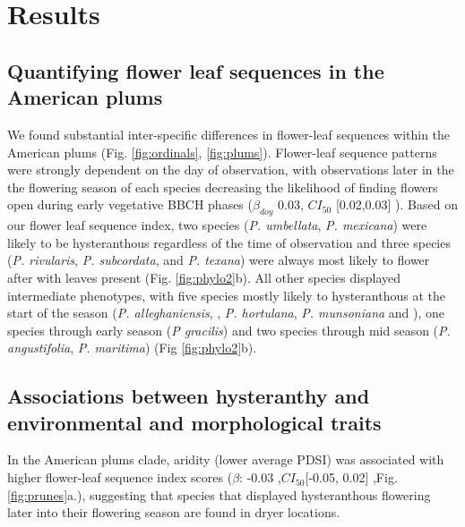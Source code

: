 \documentclass{article}[11pt]
\begin{document}
{%


\section*{Results}
\subsection*{Quantifying flower leaf sequences in the American plums}
We found substantial inter-specific differences in flower-leaf sequences within the American plums (Fig. \ref{fig:ordinals}, \ref{fig:plums}). %
Flower-leaf sequence patterns were strongly dependent on the day of observation, with observations later in the the flowering season of each species decreasing the likelihood of finding flowers open during early vegetative BBCH phases ($\beta_{doy}$ 0.03, $CI_{50}$ [0.02,0.03] ). Based on our flower leaf sequence index, two species (\textit{P. umbellata}, \textit{P. mexicana}) were likely to be hysteranthous regardless of the time of observation and three species (\textit{P. rivularis}, \textit{P. subcordata}, and \textit{P. texana}) were always most likely to flower after with leaves present (Fig. \ref{fig:phylo2}b). All other species displayed intermediate phenotypes, with five species mostly likely to hysteranthous at the start of the season (\textit{P. alleghaniensis}, , \textit{P. hortulana}, \textit{P. munsoniana} and ), one species through early season (\textit{P gracilis}) and two species through mid season (\textit{P. angustifolia}, \textit{P. maritima}) (Fig \ref{fig:phylo2}b).

\subsection*{Associations between hysteranthy and environmental and morphological traits}
In the American plums clade, aridity (lower average PDSI) was associated with higher flower-leaf sequence index scores ($\beta$: -0.03 ,$CI_{50}$[-0.05,  0.02] ,Fig. \ref{fig:prunes}a.), suggesting that species that displayed hysteranthous flowering later into their flowering season are found in dryer locations. 

}
\end{document}
